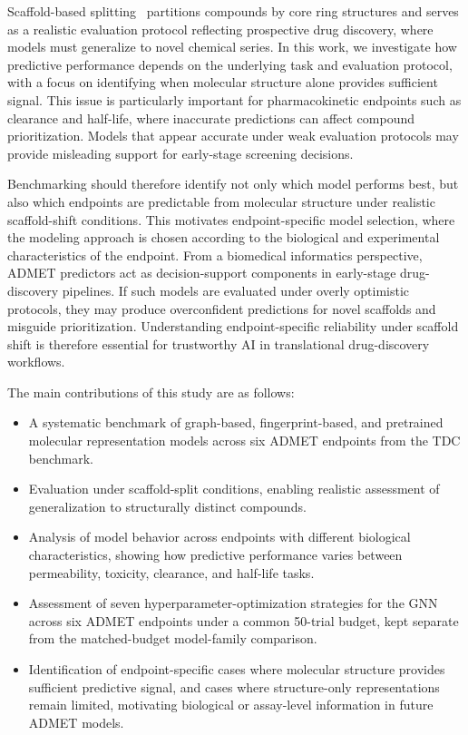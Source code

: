 \documentclass[journal]{IEEEtran}
\begin{document}
Scaffold-based splitting~\cite{doi:10.1021/jm9602928} partitions compounds by core ring structures and serves as a realistic evaluation protocol reflecting prospective drug discovery, where models must generalize to novel chemical series. In this work, we investigate how predictive performance depends on the underlying task and evaluation protocol, with a focus on identifying when molecular structure alone provides sufficient signal. This issue is particularly important for pharmacokinetic endpoints such as clearance and half-life, where inaccurate predictions can affect compound prioritization. Models that appear accurate under weak evaluation protocols may provide misleading support for early-stage screening decisions.

Benchmarking should therefore identify not only which model performs best, but also which endpoints are predictable from molecular structure under realistic scaffold-shift conditions. This motivates endpoint-specific model selection, where the modeling approach is chosen according to the biological and experimental characteristics of the endpoint. From a biomedical informatics perspective, ADMET predictors act as decision-support components in early-stage drug-discovery pipelines. If such models are evaluated under overly optimistic protocols, they may produce overconfident predictions for novel scaffolds and misguide prioritization. Understanding endpoint-specific reliability under scaffold shift is therefore essential for trustworthy AI in translational drug-discovery workflows.

The main contributions of this study are as follows:
\begin{itemize}
 \item A systematic benchmark of graph-based, fingerprint-based, and pretrained molecular representation models across six ADMET endpoints from the TDC benchmark.
 \item Evaluation under scaffold-split conditions, enabling realistic assessment of generalization to structurally distinct compounds.
 \item Analysis of model behavior across endpoints with different biological characteristics, showing how predictive performance varies between permeability, toxicity, clearance, and half-life tasks.
 \item Assessment of seven hyperparameter-optimization strategies for the GNN across six ADMET endpoints under a common 50-trial budget, kept separate from the matched-budget model-family comparison.
 \item Identification of endpoint-specific cases where molecular structure provides sufficient predictive signal, and cases where structure-only representations remain limited, motivating biological or assay-level information in future ADMET models.
\end{itemize}
\end{document}
